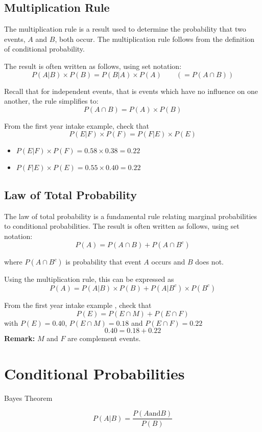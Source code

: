 \documentclass[]{report}
\begin{document}
\subsection{Multiplication Rule}
The multiplication rule is a result used to determine the probability that two events, $A$ and $B$, both occur.
The multiplication rule follows from the definition of conditional probability.\\ \bigskip

The result is often written as follows, using set notation:
\[ P(A|B)\times P(B) = P(B|A)\times P(A) \qquad \left( = P(A \cap B) \right) \]

Recall that for independent events, that is events which have no influence on one another, the rule simplifies to:
\[P(A \cap B)  = P(A)\times P(B) \]


From the first year intake example, check that
\[ P(E|F)\times P(F) = P(F|E)\times P(E)\]
\begin{itemize}
\item $P(E|F)\times P(F) = 0.58 \times 0.38  = 0.22$
\item $P(F|E)\times P(E) = 0.55 \times 0.40  = 0.22$
\end{itemize}

\subsection{Law of Total Probability}
The law of total probability is a fundamental rule relating marginal probabilities to conditional probabilities. The result is often written as follows, using set notation:
\[ P(A)  = P(A \cap B) + P(A \cap B^c) \]

where $P(A \cap B^c)$ is probability that event $A$ occurs and $B$ does not.\\ \bigskip


Using the multiplication rule, this can be expressed as
\[ P(A) = P(A | B)\times P(B) + P(A | B^{c})\times P(B^{c}) \]


From the first year intake example , check that
\[ P(E)  = P(E \cap M) + P(E \cap F) \]
with $ P(E) = 0.40$, $ P(E \cap M) = 0.18$ and  $ P(E \cap F) = 0.22$
\[ 0.40  = 0.18 + 0.22 \]
\textbf{Remark:}  $M$ and $F$ are complement events.








\section{Conditional Probabilities}
Bayes Theorem


\[ P(A|B)  = \frac{P(A \mbox{and} B)}{P(B)} \]
\end{document}
